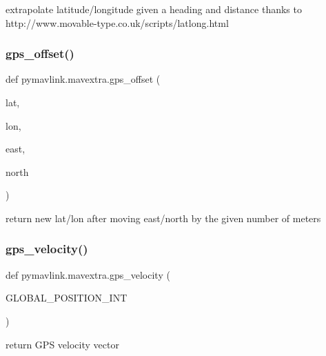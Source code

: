 \begin{DoxyVerb}extrapolate latitude/longitude given a heading and distance
thanks to http://www.movable-type.co.uk/scripts/latlong.html
\end{DoxyVerb}
 \mbox{\label{namespacepymavlink_1_1mavextra_ac5d6283932b9abee57818ce1c5a8b2c2}} 
\subsubsection{\texorpdfstring{gps\+\_\+offset()}{gps\_offset()}}
{\footnotesize\ttfamily def pymavlink.\+mavextra.\+gps\+\_\+offset (\begin{DoxyParamCaption}\item[{}]{lat,  }\item[{}]{lon,  }\item[{}]{east,  }\item[{}]{north }\end{DoxyParamCaption})}

\begin{DoxyVerb}return new lat/lon after moving east/north
by the given number of meters\end{DoxyVerb}
 \mbox{\label{namespacepymavlink_1_1mavextra_a42f6635bebc5b76277d38e5dcbdd8c4f}} 
\subsubsection{\texorpdfstring{gps\+\_\+velocity()}{gps\_velocity()}}
{\footnotesize\ttfamily def pymavlink.\+mavextra.\+gps\+\_\+velocity (\begin{DoxyParamCaption}\item[{}]{G\+L\+O\+B\+A\+L\+\_\+\+P\+O\+S\+I\+T\+I\+O\+N\+\_\+\+I\+NT }\end{DoxyParamCaption})}

\begin{DoxyVerb}return GPS velocity vector\end{DoxyVerb}
 \mbox{\label{namespacepymavlink_1_1mavextra_aee6ba92874105e32ba57d9449475661d}} 
